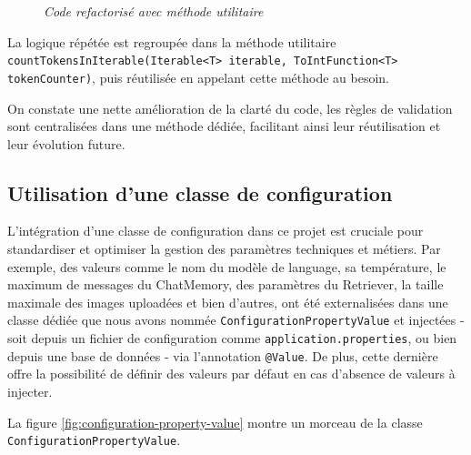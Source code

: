 \documentclass[12pt,a4paper]{report}
\begin{document}
	\begin{figure}[H]
		\centering
		\caption{\textit{Code refactorisé avec méthode utilitaire}}
		\label{fig:after-factorisation}
	\end{figure}
	
	La logique répétée est regroupée dans la méthode utilitaire \\ \verb|countTokensInIterable(Iterable<T> iterable, ToIntFunction<T> tokenCounter)|, puis réutilisée en appelant cette méthode au besoin.
	
	On constate une nette amélioration de la clarté du code, les règles de validation sont centralisées dans une méthode dédiée, facilitant ainsi leur réutilisation et leur évolution future.
	
	\subsection{Utilisation d'une classe de configuration}
	
	L’intégration d’une classe de configuration dans ce projet est cruciale pour standardiser et optimiser la gestion des paramètres techniques et métiers. Par exemple, des valeurs comme le nom du modèle de language, sa température, le maximum de messages du ChatMemory, des paramètres du Retriever, la taille maximale des images uploadées et bien d'autres, ont été externalisées dans une classe dédiée que nous avons nommée \verb|ConfigurationPropertyValue| et injectées - soit depuis un fichier de configuration comme \verb|application.properties|, ou bien depuis une base de données - via l'annotation \verb|@Value|. De plus, cette dernière offre la possibilité de définir des valeurs par défaut en cas d'absence de valeurs à injecter.
	
	La figure \ref{fig:configuration-property-value} montre un morceau de la classe \verb|ConfigurationPropertyValue|.
	
\end{document}
